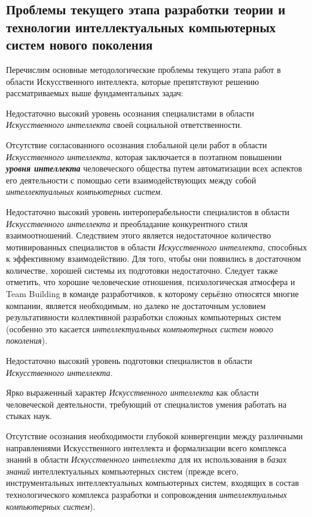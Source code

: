 \subsection*{Проблемы текущего этапа разработки теории и технологии интеллектуальных компьютерных систем нового поколения}
Перечислим основные методологические проблемы текущего этапа работ в области Искусственного интеллекта, которые препятствуют решению рассматриваемых выше фундаментальных задач:
\begin{textitemize}
	\item 
	Недостаточно высокий уровень осознания специалистами в области \textit{Искусственного интеллекта} своей социальной ответственности.
	\medskip
	\item 
	Отсутствие согласованного осознания глобальной цели работ в области \textit{Искусственного интеллекта}, которая заключается в поэтапном повышении \textbf{\textit{уровня интеллекта}} человеческого общества путем  автоматизации всех аспектов его деятельности с помощью сети взаимодействующих между собой \textit{интеллектуальных компьютерных систем}.
	\medskip
	\item 
	Недостаточно высокий уровень интероперабельности специалистов в области \textit{Искусственного интеллекта} и преобладание конкурентного стиля взаимоотношений. Следствием этого является недостаточное количество мотивированных специалистов в области \textit{Искусственного интеллекта}, способных к эффективному  взаимодействию. Для того, чтобы они появились в достаточном количестве, хорошей системы их  подготовки недостаточно. Следует также отметить, что хорошие человеческие отношения, психологическая атмосфера и Team Building в команде разработчиков, к которому серьёзно относятся многие компании, является необходимым, но далеко не достаточным условием результативности коллективной разработки сложных компьютерных систем (особенно это касается \textit{интеллектуальных компьютерных систем нового поколения}).
	\medskip
	\item 
	Недостаточно высокий уровень  подготовки специалистов в области \textit{Искусственного интеллекта}.
	\medskip
	\item 
	Ярко выраженный  характер \textit{Искусственного интеллекта} как области человеческой деятельности, требующий от специалистов умения работать на стыках наук.
	\medskip
	\item 
	Отсутствие осознания необходимости глубокой конвергенции между различными направлениями Искусственного интеллекта и формализации всего комплекса знаний в области \textit{Искусственного интеллекта} для их использования в \textit{базах знаний} интеллектуальных компьютерных систем (прежде всего, инструментальных интеллектуальных компьютерных систем, входящих в состав технологического комплекса разработки и сопровождения \textit{интеллектуальных компьютерных систем}).

\end{textitemize}
